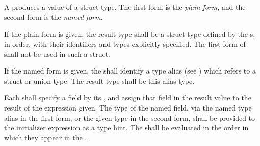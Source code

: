 \begin{grammar}
 \\
	 \terminal{\{}  \optional{\terminal{,}} \terminal{\}} \\
	 \terminal{\{}  \terminal{\}} \\

 \\
	 \optional{\terminal{,}} \\
	 \terminal{,}  \\
	 \\

 \\
	 \\
	 \terminal{,}  \\

 \\
	 \terminal{=}  \\
	 \terminal{:}  \terminal{=}  \\
	 \\
\end{grammar}

\specsubsubitem
A  produces a value of a struct type. The first
form is the \textit{plain form}, and the second form is the \textit{named form}.

\specsubsubitem
If the plain form is given, the result type shall be a struct type defined by
the s, in order, with their identifiers and types
explicitly specified. The first form of  shall not be
used in such a struct.

\specsubsubitem
If the named form is given, the  shall identify a type
alias (see ) which refers to a struct or union type.
The result type shall be this alias type.

\specsubsubitem
Each  shall specify a field by its ,
and assign that field in the result value to the result of the expression
given. The type of the named field, via the named type alias in the first form,
or the given type in the second form, shall be provided to the initializer
expression as a type hint. The  shall be evaluated in
the order in which they appear in the .

